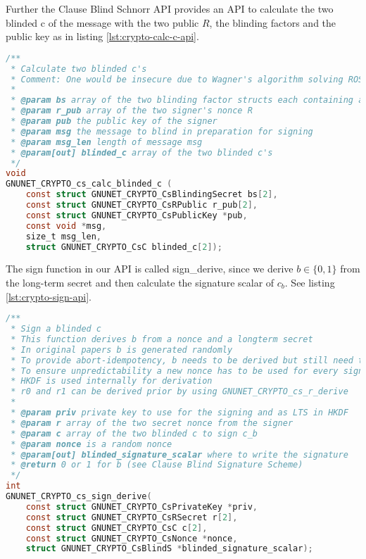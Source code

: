 Further the Clause Blind Schnorr API provides an API to calculate the two blinded c of the message with the two public $R$, the blinding factors and the public key as in listing \ref{lst:crypto-calc-c-api}.

\begin{lstlisting}[style=bfh-c,language=C, caption={GNUnet calculate blinded c API}, label={lst:crypto-calc-c-api}]
/**
 * Calculate two blinded c's
 * Comment: One would be insecure due to Wagner's algorithm solving ROS
 *
 * @param bs array of the two blinding factor structs each containing alpha and beta
 * @param r_pub array of the two signer's nonce R
 * @param pub the public key of the signer
 * @param msg the message to blind in preparation for signing
 * @param msg_len length of message msg
 * @param[out] blinded_c array of the two blinded c's
 */
void
GNUNET_CRYPTO_cs_calc_blinded_c (
    const struct GNUNET_CRYPTO_CsBlindingSecret bs[2],
    const struct GNUNET_CRYPTO_CsRPublic r_pub[2],
    const struct GNUNET_CRYPTO_CsPublicKey *pub,
    const void *msg,
    size_t msg_len,
    struct GNUNET_CRYPTO_CsC blinded_c[2]);
\end{lstlisting}

The sign function in our API is called sign\_derive, since we derive $b \in \{0,1\}$ from the long-term secret and then calculate the signature scalar of $c_b$.
See listing \ref{lst:crypto-sign-api}.

\begin{lstlisting}[style=bfh-c,language=C, caption={GNUnet sign API}, label={lst:crypto-sign-api}]
/**
 * Sign a blinded c
 * This function derives b from a nonce and a longterm secret
 * In original papers b is generated randomly
 * To provide abort-idempotency, b needs to be derived but still need to be UNPREDICTABLE.
 * To ensure unpredictability a new nonce has to be used for every signature
 * HKDF is used internally for derivation
 * r0 and r1 can be derived prior by using GNUNET_CRYPTO_cs_r_derive
 *
 * @param priv private key to use for the signing and as LTS in HKDF
 * @param r array of the two secret nonce from the signer
 * @param c array of the two blinded c to sign c_b
 * @param nonce is a random nonce
 * @param[out] blinded_signature_scalar where to write the signature
 * @return 0 or 1 for b (see Clause Blind Signature Scheme)
 */
int
GNUNET_CRYPTO_cs_sign_derive(
    const struct GNUNET_CRYPTO_CsPrivateKey *priv,
    const struct GNUNET_CRYPTO_CsRSecret r[2],
    const struct GNUNET_CRYPTO_CsC c[2],
    const struct GNUNET_CRYPTO_CsNonce *nonce,
    struct GNUNET_CRYPTO_CsBlindS *blinded_signature_scalar);
\end{lstlisting}


